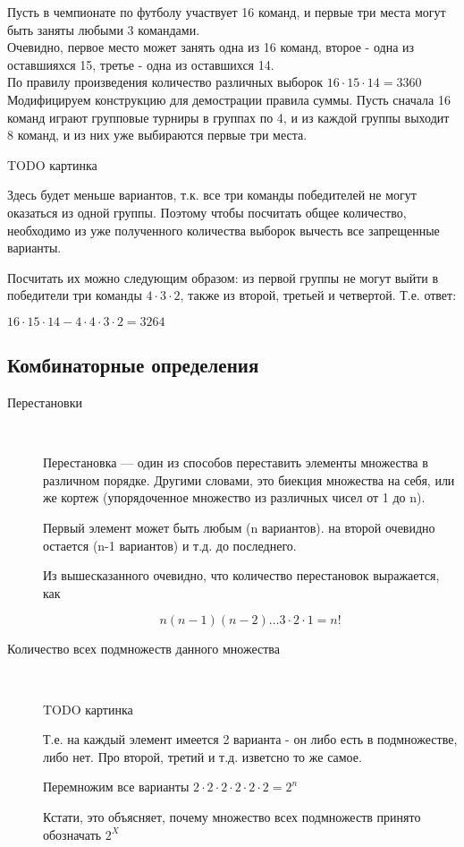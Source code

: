 Пусть в чемпионате по футболу участвует 16 команд, и первые три места могут быть заняты любыми 3 командами. \\
Очевидно, первое место может занять одна из 16 команд, второе - одна из оставшияхся 15, третье - одна из оставшихся 14. \\
По правилу произведения количество различных выборок $16 \cdot 15 \cdot 14 = 3360$ \\

Модифицируем конструкцию для демострации правила суммы. Пусть сначала 16 команд играют групповые турниры в группах по 4, и из каждой группы выходит 8 команд, и из них уже выбираются первые три места.

TODO картинка

Здесь будет меньше вариантов, т.к. все три команды победителей не могут оказаться из одной группы.
Поэтому чтобы посчитать общее количество, необходимо из уже полученного количества выборок вычесть все запрещенные варианты.

Посчитать их можно следующим образом: из первой группы не могут выйти в победители три команды $4 \cdot 3 \cdot 2$, также из второй, третьей и четвертой. Т.е. ответ:

$16 \cdot 15 \cdot 14 - 4 \cdot 4 \cdot 3 \cdot 2 = 3264$

\subsection{Комбинаторные определения}

\begin{description}
\item[Перестановки]~	

Перестановка --- один из способов переставить элементы множества в различном порядке. Другими словами, это биекция множества на себя, или же кортеж (упорядоченное множество из различных чисел от 1 до n).

Первый элемент может быть любым (n вариантов). на второй очевидно остается (n-1 вариантов) и т.д. до последнего.

Из вышесказанного очевидно, что количество перестановок выражается, как

$$
n(n-1)(n-2) \ldots 3 \cdot 2 \cdot 1 = n!
$$

\end{description}

\begin{description}
\item[Количество всех подмножеств данного множества]~	

TODO картинка

Т.е. на каждый элемент имеется 2 варианта - он либо есть в подмножестве, либо нет.
Про второй, третий и т.д. изветсно то же самое.

Перемножим все варианты
$2 \cdot 2 \cdot 2 \cdot 2 \cdot 2 \cdot 2 = 2^n$

Кстати, это объясняет, почему множество всех подмножеств принято обозначать $2^X$

\end{description}


